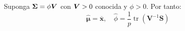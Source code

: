 Suponga $\bf{\Sigma} = \phi\bf{V}$ con $\bf{V} > 0$ conocida y $\phi > 0$. Por tanto:
$$
\widehat{\boldsymbol{\mu}}=\overline{\boldsymbol{x}}, \quad \widehat{\phi}=\frac{1}{p} \operatorname{tr}\left(\boldsymbol{V}^{-1} \boldsymbol{S}\right)
$$
